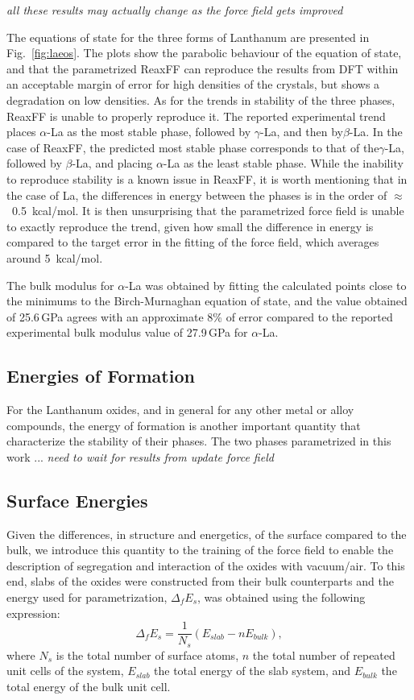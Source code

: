 \documentclass[journal=jpcafh,manuscript=article]{achemso}
\begin{document}
\emph{all these results may actually change as the force field gets improved}

The equations of state for the three forms of Lanthanum are presented in Fig.~\ref{fig:laeos}.
The plots show the parabolic behaviour of the equation of state, and that the parametrized ReaxFF can reproduce the results from DFT within an acceptable margin of error for high densities of the crystals, but shows a degradation on low densities.
As for the trends in stability of the three phases, ReaxFF is unable to properly reproduce it.
The reported experimental trend places $\alpha$-La as the most stable phase, followed by $\gamma$-La, and then by$\beta$-La.
In the case of ReaxFF, the predicted most stable phase corresponds to that of the$\gamma$-La, followed by $\beta$-La, and placing $\alpha$-La as the least stable phase.
While the inability to reproduce stability is a known issue in ReaxFF, it is worth mentioning that in the case of La, the differences in energy between the phases is in the order of $\approx$~0.5~kcal/mol.
It is then unsurprising that the parametrized force field is unable to exactly reproduce the trend,  given how small the difference in energy is compared to the target error in the fitting of the force field, which averages around 5~kcal/mol.

The bulk modulus for $\alpha$-La was obtained by fitting the calculated points close to the minimums to the Birch-Murnaghan equation of state\cite{fu_first-principles_1983}, and the value obtained of 25.6\,GPa agrees with an approximate 8\% of error compared to the reported experimental bulk modulus value of 27.9\,GPa for $\alpha$-La.\cite{lide2003crc}

\subsection{Energies of Formation}

For the Lanthanum oxides, and in general for any other metal or alloy compounds, the energy of formation is another important quantity that characterize the stability of their phases.
The two phases parametrized in this work ... \emph{need to wait for results from update force field}

\subsection{Surface Energies}

Given the differences, in structure and energetics, of the surface compared to the bulk, we introduce this quantity to the training of the force field to enable the description of segregation and interaction of the oxides with vacuum/air.
To this end, slabs of the oxides were constructed from their bulk counterparts and the energy used for parametrization, $\Delta_f E_s$, was obtained using the following expression:
\begin{equation}
    \Delta_f E_s = \frac{1}{N_s}(E_{slab} - nE_{bulk}),
\end{equation}
where $N_s$ is the total number of surface atoms, $n$ the total number of repeated unit cells of the system, $E_{slab}$ the total energy of the slab system, and $E_{bulk}$ the total energy of the bulk unit cell.
\end{document}
